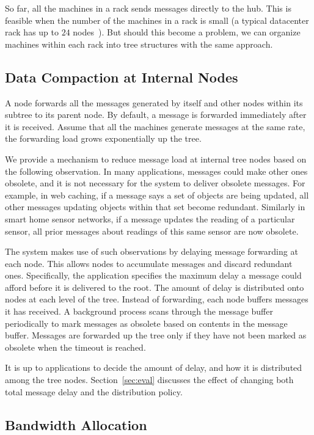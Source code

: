 So far, all the machines in a rack sends messages directly to the hub.  This is
feasible when the number of the machines in a rack is small (a typical
datacenter rack has up to $24$ nodes~\cite{ALV08}).  But should this become a
problem, we can organize machines within each rack into tree structures with
the same approach.

\subsection{Data Compaction at Internal Nodes}

A node forwards all the messages generated by itself and other nodes within its
subtree to its parent node.  By default, a message is forwarded immediately
after it is received.  Assume that all the machines generate messages at the
same rate, the forwarding load grows exponentially up the tree.

We provide a mechanism to reduce message load at internal tree nodes based on
the following observation.  In many applications, messages could make other
ones obsolete, and it is not necessary for the system to deliver obsolete
messages.  For example, in web caching, if a message says a set of objects are
being updated, all other messages updating objects within that set become
redundant.  Similarly in smart home sensor networks, if a message updates the
reading of a particular sensor, all prior messages about readings of this
same sensor are now obsolete.

The system makes use of such observations by delaying message forwarding at each
node.  This allows nodes to accumulate messages and discard redundant ones.
Specifically, the application specifies the maximum delay a message could
afford before it is delivered to the root.  The amount of delay is distributed
onto nodes at each level of the tree.  Instead of forwarding, each node buffers
messages it has received.  A background process scans through the message
buffer periodically to mark messages as obsolete based on contents in the
message buffer.  Messages are forwarded up the tree only if they have not been
marked as obsolete when the timeout is reached.

It is up to applications to decide the amount of delay, and how it is
distributed among the tree nodes.  Section~\ref{sec:eval} discusses the effect
of changing both total message delay and the distribution policy.

\subsection{Bandwidth Allocation}

